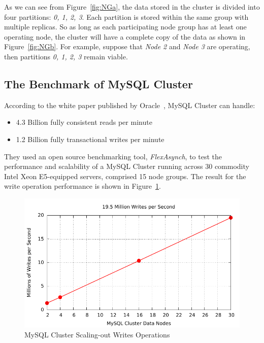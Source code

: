 \noindent As we can see from Figure~\ref{fig:NGa}, the data stored in the cluster is divided into four partitions: \textit{0, 1, 2, 3}. Each partition is stored within the same group with multiple replicas. So as long as each participating node group has at least one operating node, the cluster will have a complete copy of the data as shown in Figure~\ref{fig:NGb}. For example, suppose that \textit{Node 2} and\textit{ Node 3} are operating, then partitions \textit{0, 1, 2, 3} remain viable.

\subsection{The Benchmark of MySQL Cluster}
According to the white paper published by Oracle~\cite{mysqlclusterwhitepaper}, MySQL Cluster can handle:
\begin{itemize}[noitemsep]
	\item 4.3 Billion fully consistent reads per minute
	\item 1.2 Billion fully transactional writes per minute
\end{itemize}

\noindent They used an open source benchmarking tool, \textit{FlexAsynch}, to test the performance and scalability of a MySQL Cluster running across 30 commodity Intel Xeon E5-equipped servers, comprised 15 node groups. The result for the write operation performance is shown in Figure~\ref{fig:mysqlwrite}.

\begin{figure}[h!]
	\centering
	\includegraphics[width=\linewidth]{figs/mysqlclusterbenchmark.pdf}
	\caption{MySQL Cluster Scaling-out Writes Operations}
	\label{fig:mysqlwrite}
\end{figure}

